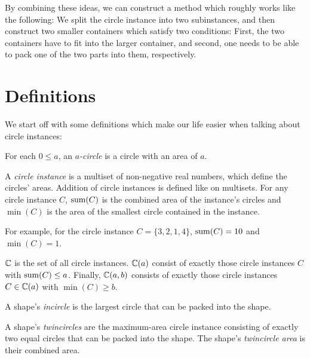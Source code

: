 \documentclass[a4paper,style=print,bibliography=totoc,nexus,lnum,extramargin]{tubsbook}
\begin{document}
By combining these ideas, we can construct a method which roughly works like the following: We split the circle instance into two subinstances, and then construct two smaller containers which satisfy two conditions: First, the two containers have to fit into the larger container, and second, one needs to be able to pack one of the two parts into them, respectively.

\section{Definitions}

We start off with some definitions which make our life easier when talking about circle instances:

\begin{definition}
    For each $0 \le a$, an \emph{$a$-circle} is a circle with an area of $a$.
\end{definition}

\begin{definition}
    A \emph{circle instance} is a multiset of non-negative real numbers, which define the circles' areas. Addition of circle instances is defined like on multisets.
    For any circle instance $C$, $\operatorname{sum}(C)$ is the combined area of the instance's circles and $\min(C)$ is the area of the smallest circle contained in the instance.
\end{definition}

For example, for the circle instance $C = \{3,2,1,4\}$, $\operatorname{sum}(C) = 10$ and $\min(C) = 1$.

\begin{definition}
    $\mathbb{C}$ is the set of all circle instances. $\mathbb{C}(a)$ consist of exactly those circle instances $C$ with $\operatorname{sum}(C) \le a$. Finally, $\mathbb{C}(a,b)$ consists of exactly those circle instances $C \in \mathbb{C}(a)$ with $\min(C) \ge b$.
\end{definition}

\begin{definition}
    A shape's \emph{incircle} is the largest circle that can be packed into the shape.
\end{definition}

\begin{definition}
    A shape's \emph{twincircles} are the maximum-area circle instance consisting of exactly two equal circles that can be packed into the shape. The shape's \emph{twincircle area} is their combined area.
\end{definition}
\end{document}
